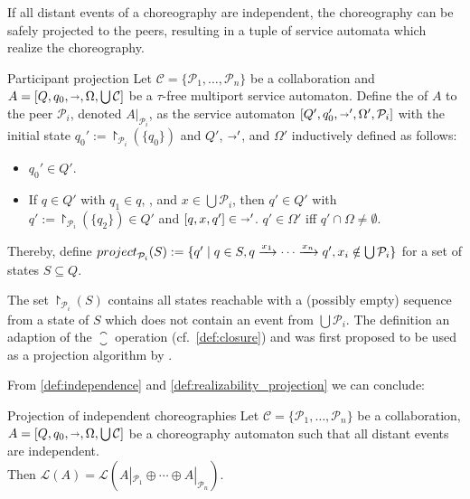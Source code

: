 If all distant events of a choreography are independent, the choreography can be safely projected to the peers, resulting in a tuple of service automata which realize the choreography.

\begin{definition}{Participant projection}
\label{def:realizability_projection}%
%
Let $\mathcal{C}=\{\mathcal{P}_{1},\ldots,\mathcal{P}_{n}\}$ be a collaboration and $A=[Q,q_{0},{\shortrightarrow},\Omega,\bigcup\mathcal{C}]$ be a $\tau$-free multiport service automaton. Define the  of $A$ to the peer $\mathcal{P}_{i}$, denoted $A|_{\mathcal{P}_{i}}$, as the service automaton $[Q',q_{0}',{\shortrightarrow}',\Omega',\mathcal{P}_{i}]$ with the initial state $q_{0}':=\project_{\mathcal{P}_{i}}(\{q_{0}\})$ and $Q'$, ${\shortrightarrow}'$, and $\Omega'$ inductively defined as follows:
\begin{itemize}
\item $q_{0}'\in Q'$.
\item If $q\in Q'$ with $q_{1}\in q$, , and $x\in \bigcup \mathcal{P}_{i}$, then $q'\in Q'$ with $q':=\project_{\mathcal{P}_{i}}(\{q_{2}\})\in Q'$ and $[q,x,q']\in{\shortrightarrow}'$. $q'\in \Omega'$ iff $q'\cap \Omega\neq\emptyset$.
\end{itemize}
Thereby, define $\mathop{project}_{\mathcal{P}_{i}}(S):=\{q'\mid q\in S, \smash{q\xrightarrow{x_{1}}\cdots \xrightarrow{x_{n}} q'}, x_{i}\notin \bigcup \mathcal{P}_{i}\}$ for a set of states $S\subseteq Q$.
\end{definition}

The set $\project_{\mathcal{P}_{i}}(S)$ contains all states reachable with a (possibly empty) sequence from a state of $S$ which does not contain an event from $\bigcup \mathcal{P}_{i}$. The definition an adaption of the $\closure$ operation (cf.\ \autoref{def:closure}) and was first proposed to be used as a projection algorithm by \citet{Decker_2009_zeus,Decker_2009_phd}.

From \autoref{def:independence} and \autoref{def:realizability_projection} we can conclude:

\begin{corollary}{Projection of independent choreographies}
Let $\mathcal{C}=\{\mathcal{P}_{1},\ldots,\mathcal{P}_{n}\}$ be a collaboration, $A=[Q,q_{0},{\shortrightarrow},\Omega,\bigcup\mathcal{C}]$ be a choreography automaton such that all distant events are independent.\\ Then $\mathcal{L}(A)=\mathcal{L}(A|_{\mathcal{P}_{1}}\oplus\cdots\oplus A|_{\mathcal{P}_{n}})$.
\end{corollary}


